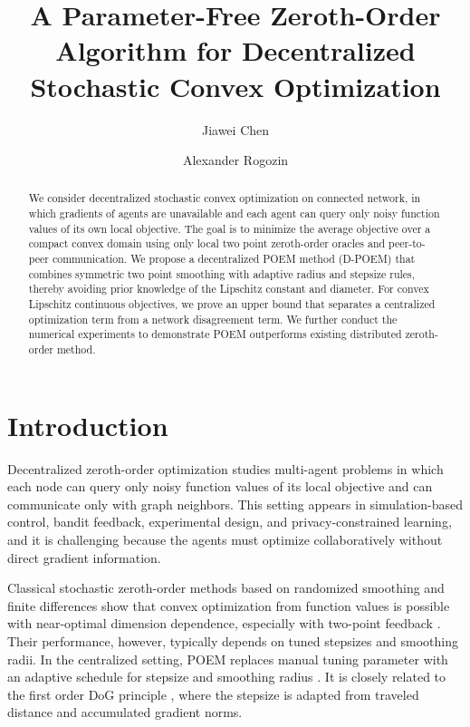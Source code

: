 \documentclass[runningheads]{llncs}
\begin{document}
%
\title{A Parameter-Free  Zeroth-Order Algorithm for Decentralized Stochastic Convex Optimization
}
%
%
\author{Jiawei Chen \and
Alexander Rogozin}
%
%
%
\maketitle              %
%
\begin{abstract}
We consider decentralized stochastic convex optimization on connected network, 
in which  gradients of agents are unavailable and each agent can query only noisy
function values of its own local objective. The goal is to minimize the average
objective over a compact convex domain using only local two point zeroth-order
oracles and peer-to-peer communication. We propose a decentralized POEM
method (D-POEM) that combines symmetric two point smoothing with adaptive
radius and stepsize rules, thereby avoiding prior knowledge of the Lipschitz
constant and diameter. For convex Lipschitz continuous objectives, we prove an
upper bound  that separates a centralized
optimization term from a network disagreement term.
We further conduct the numerical experiments to demonstrate POEM outperforms existing distributed zeroth-order method.
\end{abstract}
%
%
%
\section{Introduction}
Decentralized zeroth-order optimization studies multi-agent problems in which
each node can query only noisy function values of its local objective and can
communicate only with graph neighbors. This setting appears in simulation-based
control, bandit feedback, experimental design, and privacy-constrained
learning, and it is challenging because the agents must optimize
collaboratively without direct gradient information.

Classical stochastic zeroth-order methods based on randomized smoothing and
finite differences show that convex optimization from function values is
possible with near-optimal dimension dependence, especially with two-point
feedback \cite{duchi2015optimal,nesterov2017random,shamir2017optimal}. Their performance, however,
typically depends on tuned stepsizes and smoothing radii. In the centralized
setting, POEM replaces manual tuning parameter with an adaptive schedule for stepsize and 
smoothing radius \cite{renparameter}. It is closely related to the first
order DoG principle \cite{ivgi2023dog}, where the stepsize is adapted from traveled
distance and accumulated gradient norms.
\end{document}
